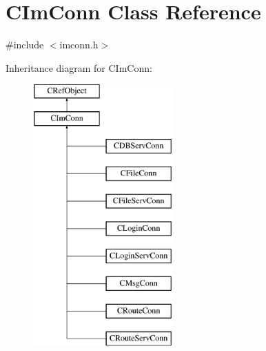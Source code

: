 \hypertarget{class_c_im_conn}{}\section{C\+Im\+Conn Class Reference}
\label{class_c_im_conn}


{\ttfamily \#include $<$imconn.\+h$>$}

Inheritance diagram for C\+Im\+Conn\+:\begin{figure}[H]
\begin{center}
\leavevmode
\includegraphics[height=10.000000cm]{class_c_im_conn}
\end{center}
\end{figure}
